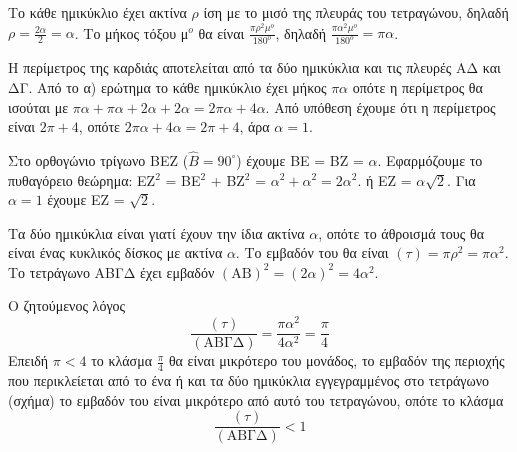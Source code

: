\begin{alist}
    \item Το κάθε ημικύκλιο έχει ακτίνα $\rho$ ίση με το μισό της πλευράς του τετραγώνου, δηλαδή $\rho = \frac{2\alpha}{2} = \alpha$. Το μήκος τόξου μ$^o$ θα είναι $\frac{\pi \rho^2 \mu^o}{180^o}$, δηλαδή $\frac{\pi \alpha^2 \mu^o}{180^o} = \pi \alpha$.

    \item \begin{rlist}
        \item Η περίμετρος της καρδιάς αποτελείται από τα δύο ημικύκλια και τις πλευρές ΑΔ και ΔΓ. Από το α) ερώτημα το κάθε ημικύκλιο έχει μήκος $\pi \alpha$ οπότε η περίμετρος θα ισούται με $\pi \alpha + \pi \alpha + 2\alpha + 2\alpha = 2\pi \alpha + 4\alpha$. Από υπόθεση έχουμε ότι η περίμετρος είναι $2\pi + 4$, οπότε $2\pi \alpha + 4\alpha = 2\pi + 4$, άρα $\alpha = 1$.
        \item Στο ορθογώνιο τρίγωνο ΒΕΖ ($\hat{B} = 90^\circ$) έχουμε ΒΕ = ΒΖ = $\alpha$. Εφαρμόζουμε το πυθαγόρειο θεώρημα: ΕΖ$^2$ = ΒΕ$^2$ + ΒΖ$^2$ = $\alpha^2 + \alpha^2 = 2\alpha^2$. ή ΕΖ = $\alpha\sqrt{2}$. Για $\alpha = 1$ έχουμε ΕΖ = $\sqrt{2}$.
    \end{rlist}

    \item Τα δύο ημικύκλια είναι γιατί έχουν την ίδια ακτίνα $\alpha$, οπότε το άθροισμά τους θα είναι ένας κυκλικός δίσκος με ακτίνα $\alpha$.
    Το εμβαδόν του θα είναι $(\tau) = \pi \rho^2 = \pi \alpha^2$.
    Το τετράγωνο ΑΒΓΔ έχει εμβαδόν $(\text{ΑΒ})^2 = (2\alpha)^2 = 4\alpha^2$.

    Ο ζητούμενος λόγος
    \[ \frac{(\tau)}{(\text{ΑΒΓΔ})} = \frac{\pi \alpha^2}{4\alpha^2} = \frac{\pi}{4} \]
    Επειδή $\pi < 4$ το κλάσμα $\frac{\pi}{4}$ θα είναι μικρότερο του μονάδος, το εμβαδόν της περιοχής που περικλείεται από το ένα ή και τα δύο ημικύκλια εγγεγραμμένος στο τετράγωνο (σχήμα) το εμβαδόν του είναι μικρότερο από αυτό του τετραγώνου, οπότε το κλάσμα
    \[ \frac{(\tau)}{(\text{ΑΒΓΔ})} < 1 \]
\end{alist}